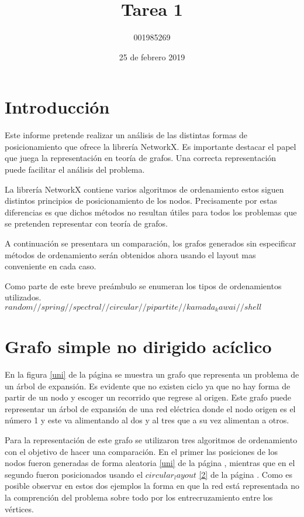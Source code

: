 \documentclass{article}
\title{Tarea 1}
\date{25 de febrero 2019}
\author{001985269 }
\begin{document}
\maketitle


\section{Introducción}
Este informe pretende realizar un an\'alisis de las distintas formas de posicionamiento que ofrece la librer\'ia NetworkX. Es importante destacar el papel que juega la representaci\'on en teor\'ia de grafos. Una correcta representaci\'on puede facilitar el análisis del problema.

La librería NetworkX contiene varios algoritmos de ordenamiento estos siguen distintos principios de posicionamiento de los nodos. Precisamente por estas diferencias es que dichos métodos no resultan útiles para todos los problemas que se pretenden representar con teoría de grafos.

A continuación se presentara un comparación, los grafos generados sin especificar m\'etodos de ordenamiento ser\'an obtenidos ahora usando el layout mas conveniente en cada caso.

Como parte de este breve preámbulo se enumeran los tipos de ordenamientos utilizados.
$random//spring//spectral//circular//pipartite//kamada_kawai//shell$
 

\section{Grafo simple no dirigido acíclico}

En la figura \ref{uni} de la página \pageref{uni} se muestra un grafo que representa un problema de un árbol de expansión. Es evidente que no existen ciclo ya que no hay forma de partir de un nodo y escoger un recorrido que regrese al origen. Este grafo puede representar un árbol de expansión de una red eléctrica donde el nodo origen es el n\'umero 1 y este va alimentando al dos y al tres que a su vez alimentan a otros.

Para la representaci\'on de este grafo se utilizaron tres algoritmos de ordenamiento con el objetivo de hacer una comparaci\'on. En el primer las posiciones de los nodos fueron generadas de forma aleatoria \ref{uni} de la página \pageref{uni}, mientras que en el segundo fueron posicionados usando el $circular_layout$ \ref{2} de la página \pageref{2}. Como es posible observar en estos dos ejemplos la forma en que la red est\'a representada no  la comprenci\'on del problema sobre todo por los entrecruzamiento entre los v\'ertices.
\end{document}
